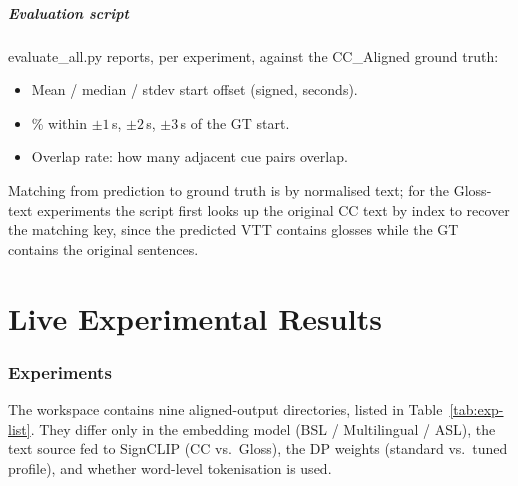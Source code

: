 \documentclass[11pt,a4paper]{article}
\def\texttt#1{#1}%
\def\textbf#1{#1}%
\def\emph#1{#1}%
\begin{document}
\subsubsection{Evaluation script}
\texttt{evaluate\_all.py} reports, per experiment, against the
\texttt{CC\_Aligned} ground truth:
\begin{itemize}[leftmargin=1.5em]
  \item \textbf{Mean / median / stdev start offset} (signed, seconds).
  \item \textbf{\% within $\pm 1\,$s, $\pm 2\,$s, $\pm 3\,$s} of the GT start.
  \item \textbf{Overlap rate}: how many adjacent cue pairs overlap.
\end{itemize}
Matching from prediction to ground truth is by \emph{normalised text}; for
the Gloss-text experiments the script first looks up the original CC text by
index to recover the matching key, since the predicted VTT contains glosses
while the GT contains the original sentences.

\clearpage
\part{Live Experimental Results}

\section{Experiments}
\label{sec:exp}

The workspace contains nine aligned-output directories, listed in
Table~\ref{tab:exp-list}. They differ only in the embedding model (BSL /
Multilingual / ASL), the text source fed to SignCLIP (CC vs.\ Gloss), the
DP weights (\emph{standard} vs.\ \emph{tuned} profile), and whether
word-level tokenisation is used.
\end{document}
